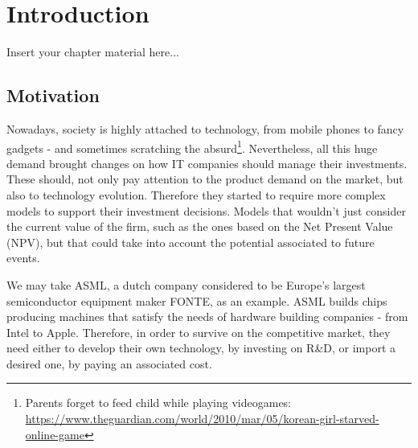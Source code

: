 
\chapter{Introduction}
\label{chapter:introduction}

Insert your chapter material here...

\section{Motivation}
\label{section:motivation}

Nowadays, society is highly attached to technology, from mobile phones to fancy gadgets - and sometimes scratching the absurd\footnote{Parents forget to feed child while playing videogames:\\
\url{https://www.theguardian.com/world/2010/mar/05/korean-girl-starved-online-game} }.
 Nevertheless, all this huge demand brought changes on how IT companies should manage their investments. These should, not only pay attention to the product demand on the market, but also to technology evolution. Therefore they started to require more complex models to support their investment decisions. Models that wouldn't just consider the current value of the firm, such as the ones based on the Net Present Value (NPV), but that could take into account the potential associated to future events.

We may take ASML, a dutch company considered to be Europe's largest semiconductor equipment maker FONTE, as an example.
ASML builds chips producing machines that satisfy the needs of hardware building companies - from Intel to Apple.
Therefore, in order to survive on the competitive market, they need either to develop their own technology, by investing on R\&D, or import a desired one, by paying an associated cost.

